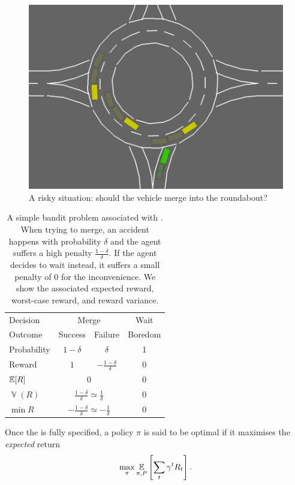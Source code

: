 \begin{figure}[ht]
	\centering
	\includegraphics[trim={0 0.5cm 0 0}, clip, width=0.5\linewidth]{img/roundabout3-small}
	\caption{A risky situation: should the vehicle merge into the roundabout?}
	\label{fig:risky-problem}
\end{figure}
\begin{table}[ht]
	\centering
	\begin{tabular}{lccc}
		\toprule
		Decision & \multicolumn{2}{c}{Merge} & Wait \\
		\cmidrule(lr){2-3}
		\cmidrule(lr){4-4}
		Outcome & Success & Failure & Boredom \\
		Probability & $1-\delta$ & $\delta$ & 1 \\
		Reward & $1$ & $-\frac{1-\delta}{\delta}$ & 0 \\
		\midrule
		$\operatorname*{\mathbb{E}}[R]$ & \multicolumn{2}{c}{$0$} & $0$ \\
		$\mathop{\mathbb{V}}(R)$ & \multicolumn{2}{c}{$\frac{1-\delta}{\delta} \simeq \frac{1}{\delta}$} & $0$ \\
		$\min R$ & \multicolumn{2}{c}{$-\frac{1-\delta}{\delta} \simeq -\frac{1}{\delta}$} & $0$ \\
		\bottomrule	
	\end{tabular}
	\caption{A simple bandit problem associated with . When trying to merge, an accident happens with probability $\delta$ and the agent suffers a high penalty $\frac{1-\delta}{\delta}$. If the agent decides to wait instead, it suffers a small penalty of $0$ for the inconvenience. We show the associated expected reward, worst-case reward, and reward variance.}
	\label{tab:risky-problem}
\end{table}

Once the  is fully specified, a policy $\pi$ is said to be optimal if it maximises the \emph{expected} return
\begin{equation*}
\max_\pi \operatorname*{\mathbb{E}}_{\pi, P} \left[\sum_t \gamma^t R_t \right].
\end{equation*}

